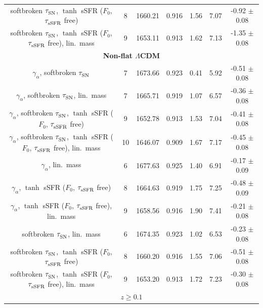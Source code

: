 \begin{longtable}{c c c c c c c}
    softbroken $\tau_{\rm SN}^{}$, $\tanh$ sSFR ($F_0$, $\tau_{\rm sSFR}^{}$ free) & 8 & 1660.21 & 0.916 & 1.56 & \cellcolor{aiclightred}7.07 & -0.92 $\pm$ 0.08 \\
    softbroken $\tau_{\rm SN}^{}$, $\tanh$ sSFR ($F_0$, $\tau_{\rm sSFR}^{}$ free), lin.\ mass & 9 & 1653.11 & 0.913 & 1.62 & \cellcolor{aiclightred}7.13 & \cellcolor{aicorange}-1.35 $\pm$ 0.08 \\
    \hline
    \multicolumn{7}{c}{\textbf{Non-flat $\Lambda$CDM}} \\
    \hline
    $\gamma_\alpha^{}$, softbroken $\tau_{\rm SN}^{}$ & 7 & 1673.66 & 0.923 & 0.41 & \cellcolor{aicorange}5.92 & -0.51 $\pm$ 0.08 \\
    $\gamma_\alpha^{}$, softbroken $\tau_{\rm SN}^{}$, lin.\ mass & 7 & 1665.71 & 0.919 & 1.07 & \cellcolor{aiclightred}6.57 & -0.36 $\pm$ 0.08 \\
    $\gamma_\alpha^{}$, softbroken $\tau_{\rm SN}^{}$, $\tanh$ sSFR ($F_0$, $\tau_{\rm sSFR}^{}$ free) & 9 & 1652.78 & 0.913 & 1.53 & \cellcolor{aiclightred}7.04 & -0.41 $\pm$ 0.08 \\
    $\gamma_\alpha^{}$, softbroken $\tau_{\rm SN}^{}$, $\tanh$ sSFR ($F_0$, $\tau_{\rm sSFR}^{}$ free), lin.\ mass & 10 & 1646.07 & 0.909 & 1.67 & \cellcolor{aiclightred}7.17 & -0.45 $\pm$ 0.08 \\
    $\gamma_\alpha^{}$, lin.\ mass & 6 & 1677.63 & 0.925 & 1.40 & \cellcolor{aiclightred}6.91 & -0.17 $\pm$ 0.09 \\
    $\gamma_\alpha^{}$, $\tanh$ sSFR ($F_0$, $\tau_{\rm sSFR}^{}$ free) & 8 & 1664.63 & 0.919 & 1.75 & \cellcolor{aiclightred}7.25 & -0.48 $\pm$ 0.09 \\
    $\gamma_\alpha^{}$, $\tanh$ sSFR ($F_0$, $\tau_{\rm sSFR}^{}$ free), lin.\ mass & 9 & 1658.56 & 0.916 & 1.90 & \cellcolor{aiclightred}7.41 & -0.21 $\pm$ 0.08 \\
    softbroken $\tau_{\rm SN}^{}$, lin.\ mass & 6 & 1674.35 & 0.923 & 1.02 & \cellcolor{aiclightred}6.53 & -0.23 $\pm$ 0.08 \\
    softbroken $\tau_{\rm SN}^{}$, $\tanh$ sSFR ($F_0$, $\tau_{\rm sSFR}^{}$ free) & 8 & 1660.20 & 0.916 & 1.55 & \cellcolor{aiclightred}7.06 & -0.51 $\pm$ 0.08 \\
    softbroken $\tau_{\rm SN}^{}$, $\tanh$ sSFR ($F_0$, $\tau_{\rm sSFR}^{}$ free), lin.\ mass & 9 & 1653.20 & 0.913 & 1.72 & \cellcolor{aiclightred}7.23 & -0.30 $\pm$ 0.08 \\
    \hline
    \multicolumn{7}{c}{\textbf{$z \geq 0.1$}} \\

\end{longtable}
